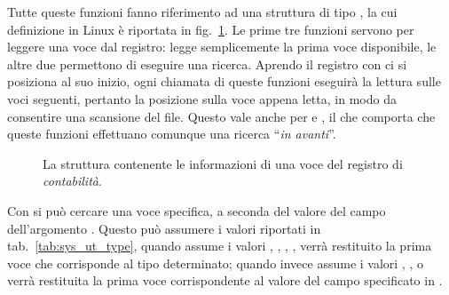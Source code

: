 Tutte queste funzioni fanno riferimento ad una struttura di tipo
, la cui definizione in Linux è riportata in
fig.~\ref{fig:sys_utmp_struct}. Le prime tre funzioni servono per leggere una
voce dal registro:  legge semplicemente la prima voce
disponibile, le altre due permettono di eseguire una ricerca. Aprendo il
registro con  ci si posiziona al suo inizio, ogni chiamata di
queste funzioni eseguirà la lettura sulle voci seguenti, pertanto la posizione
sulla voce appena letta, in modo da consentire una scansione del file. Questo
vale anche per  e , il che comporta che queste
funzioni effettuano comunque una ricerca ``\textsl{in avanti}''.

\begin{figure}[!htb]
  \footnotesize
  \centering
  \begin{minipage}[c]{0.9\textwidth}
  \end{minipage} 
  \normalsize 
  \caption{La struttura  contenente le informazioni di una voce
    del registro di \textsl{contabilità}.}
  \label{fig:sys_utmp_struct}
\end{figure}

Con  si può cercare una voce specifica, a seconda del valore del
campo  dell'argomento .  Questo può assumere i valori
riportati in tab.~\ref{tab:sys_ut_type}, quando assume i valori
, , , ,
verrà restituito la prima voce che corrisponde al tipo determinato; quando
invece assume i valori , ,
 o  verrà restituita la prima voce
corrispondente al valore del campo  specificato in .

